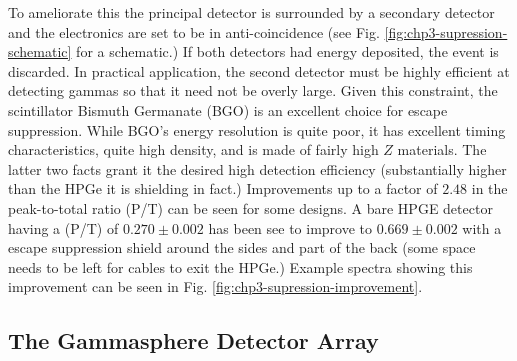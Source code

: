To ameliorate this the principal detector is surrounded by a secondary detector and the electronics are set to be in anti-coincidence (see Fig. \ref{fig:chp3-supression-schematic} for a schematic.) If both detectors had energy deposited, the event is discarded. In practical application, the second detector must be highly efficient at detecting gammas so that it need not be overly large. Given this constraint, the scintillator Bismuth Germanate (BGO) is an excellent choice for escape suppression. While BGO's energy resolution is quite poor, it has excellent timing characteristics, quite high density, and is made of fairly high $Z$ materials. The latter two facts grant it the desired high detection efficiency (substantially higher than the HPGe it is shielding in fact.) Improvements up to a factor of $2.48$ in the peak-to-total ratio (P/T) can be seen for some designs. A bare HPGE detector having a (P/T) of $0.270\pm0.002$ has been see to improve to $0.669\pm0.002$\cite{GSComptonSuppression} with a escape suppression shield around the sides and part of the back (some space needs to be left for cables to exit the HPGe.) Example spectra showing this improvement can be seen in Fig. \ref{fig:chp3-supression-improvement}.

\subsection{The Gammasphere Detector Array}
\label{ssec:exp-pr-gamma-gammasphere}

